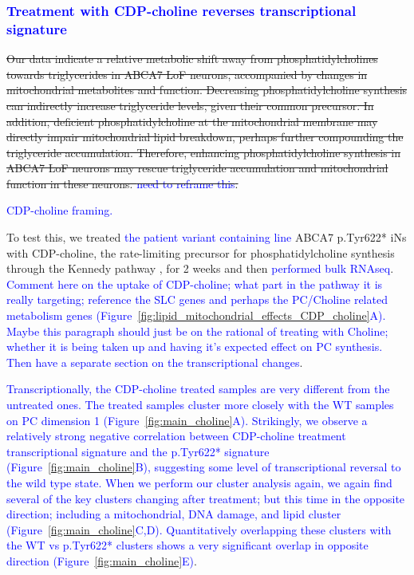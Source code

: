 \subsubsection{\textcolor{blue}{Treatment with CDP-choline reverses transcriptional signature}}
\sout{Our data indicate a relative metabolic shift away from phosphatidylcholines towards triglycerides in ABCA7 LoF neurons, accompanied by changes in mitochondrial metabolites and function. Decreasing phosphatidylcholine synthesis can indirectly increase triglyceride levels, given their common precursor\cite{Farese2023-bb}.  In addition, deficient phosphatidylcholine at the mitochondrial membrane may directly impair mitochondrial lipid breakdown, perhaps further compounding the triglyceride accumulation\cite{Schuler2016-tr,Szymkowicz2019-be,Mejia2015-tw,Prola2021-uz}. Therefore, enhancing phosphatidylcholine synthesis in ABCA7 LoF neurons may rescue triglyceride accumulation and mitochondrial function in these neurons. \textcolor{blue}{need to reframe this}.}

\textcolor{blue}{CDP-choline framing.}

To test this, we treated \textcolor{blue}{the patient variant containing line} ABCA7 p.Tyr622* iNs with CDP-choline, the rate-limiting precursor for phosphatidylcholine synthesis through the Kennedy pathway \cite{Zeisel2009-xv,Son2024-tu}, for 2 weeks and then \textcolor{blue}{performed bulk RNAseq}. \textcolor{blue}{Comment here on the uptake of CDP-choline; what part in the pathway it is really targeting; reference the SLC genes and perhaps the PC/Choline related metabolism genes (Figure~\ref{fig:lipid_mitochondrial_effects_CDP_choline}A). Maybe this paragraph should just be on the rational of treating with Choline; whether it is being taken up and having it's expected effect on PC synthesis. Then have a separate section on the transcriptional changes}.

\textcolor{blue}{Transcriptionally, the CDP-choline treated samples are very different from the untreated ones. The treated samples cluster more closely with the WT samples on PC dimension 1 (Figure~\ref{fig:main_choline}A). Strikingly, we observe a relatively strong negative correlation between CDP-choline treatment transcriptional signature and the p.Tyr622* signature (Figure~\ref{fig:main_choline}B), suggesting some level of transcriptional reversal to the wild type state. When we perform our cluster analysis again, we again find several of the key clusters changing after treatment; but this time in the opposite direction; including a mitochondrial, DNA damage, and lipid cluster (Figure~\ref{fig:main_choline}C,D). Quantitatively overlapping these clusters with the WT vs p.Tyr622* clusters shows a very significant overlap in opposite direction (Figure~\ref{fig:main_choline}E)}.

